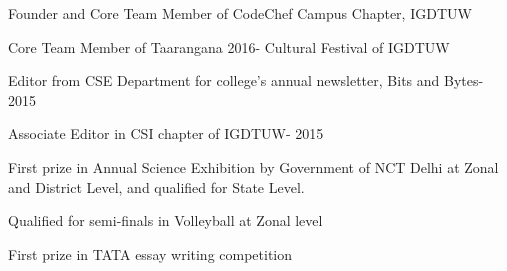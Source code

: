 \documentclass[]{resume-openfont}
\begin{document}
\begin{minipage}[t]{0.66\textwidth}
\begin{tightemize}
\item Founder and Core Team Member of CodeChef Campus Chapter, IGDTUW
\item Core Team Member of Taarangana 2016- Cultural Festival of IGDTUW \\
\item Editor from CSE Department for college’s annual newsletter, Bits and Bytes- 2015
\item Associate Editor in CSI chapter of IGDTUW- 2015 \\
\end{tightemize}
\sectionsep

\begin{tightemize}
\item First prize in Annual Science Exhibition by Government of NCT Delhi at Zonal and District Level, and qualified for State Level.
\item Qualified for semi-finals in Volleyball at Zonal level
\item First prize in TATA essay writing competition
\end{tightemize}

\end{minipage} 
\end{document}
